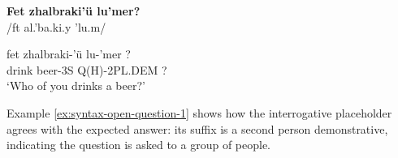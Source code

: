 \begin{exe}
\ex\label{ex:syntax-open-question-1}
\textbf{Fet zhalbraki’ü lu’mer?}\\
/f{\ipaE}t {\ipaZ}al.'b{\ipaR}a.ki.y 'lu.m{\ipaE\ipaR}/

\gll fet zhalbraki-’ü lu-’mer ?\\
drink beer-3S Q(H)-2PL.DEM ?\\
\trans ‘Who of you drinks a beer?’
\end{exe}

Example \ref{ex:syntax-open-question-1} shows how the interrogative placeholder agrees with the expected answer:
its suffix is a second person demonstrative, indicating the question is asked to a group of people.

